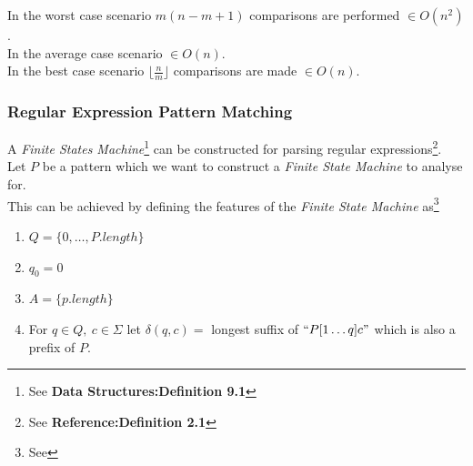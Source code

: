 \documentclass[11pt,a4paper]{article}
\begin{document}
\newpage
{}
In the worst case scenario $m(n-m+1)$ comparisons are performed $\in O(n^2)$.\\
In the average case scenario $\in O(n)$.\\
In the best case scenario $\lfloor\frac{n}{m}\rfloor$ comparisons are made $\in O(n)$.

\subsubsection{Regular Expression Pattern Matching}

A \textit{Finite States Machine}\footnote{See \textbf{Data Structures:Definition 9.1}} can be constructed for parsing regular expressions\footnote{See \textbf{Reference:Definition 2.1}}.\\
Let $P$ be a pattern which we want to construct a \textit{Finite State Machine} to analyse for.\\
This can be achieved by defining the features of the \textit{Finite State Machine} as\footnote{See {}}
\begin{enumerate}[label=\roman*)]
  \item $Q = \{0,\dots,P.length\}$
  \item $q_0=0$
  \item $A=\{p.length\}$
  \item For $q\in Q,\ c\in\Sigma$ let $\delta(q,c) = $ longest suffix of  $``P[1\dots q]c"$ which is also a prefix of $P$.
\end{enumerate}
\end{document}
